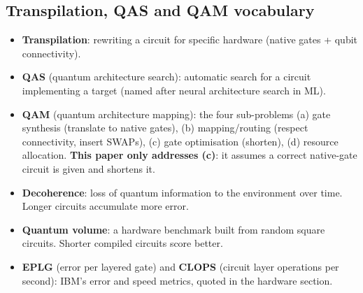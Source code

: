 \documentclass[11pt,a4paper]{article}
\begin{document}
\subsection{Transpilation, QAS and QAM vocabulary}
\begin{itemize}[nosep]
\item \textbf{Transpilation}: rewriting a circuit for specific hardware (native gates + qubit connectivity).
\item \textbf{QAS} (quantum architecture search): automatic search for a circuit implementing a target
  (named after neural architecture search in ML).
\item \textbf{QAM} (quantum architecture mapping): the four sub-problems (a) gate synthesis (translate to native gates),
  (b) mapping/routing (respect connectivity, insert SWAPs), (c) gate optimisation (shorten), (d) resource allocation.
  \textbf{This paper only addresses (c)}: it assumes a correct native-gate circuit is given and shortens it.
\item \textbf{Decoherence}: loss of quantum information to the environment over time. Longer circuits accumulate more error.
\item \textbf{Quantum volume}: a hardware benchmark built from random square circuits. Shorter compiled circuits score better.
\item \textbf{EPLG} (error per layered gate) and \textbf{CLOPS} (circuit layer operations per second): IBM's
  error and speed metrics, quoted in the hardware section.
\end{itemize}
\end{document}
